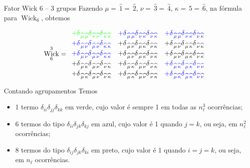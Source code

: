 \documentclass{beamer}
\DeclareMathOperator{\Wick}{Wick}
\def\mi#1{{\,\widehat{#1}}}
\def\ddelta#1#2{\delta_{\mi{#1}\mi{#2}}}
\begin{document}
\begin{frame}{Fator Wick 6 -- 3 grupos} 
	Fazendo $\mu=\mi1=\mi2$, $\nu=\mi3=\mi4$, $\kappa=\mi5=\mi6$, na fórmula para $\Wick_6$, obtemos
 
	\begin{equation*}
		\Wick_6^3 = 
		\begin{array}{c c c}
			\color{green}+ \ddelta{\mu}{\mu} \ddelta{\nu}{\nu} \ddelta{\kappa}{\kappa} &\color{blue} +\ddelta{\mu}{\mu} \ddelta{\nu}{\kappa} \ddelta{\nu}{\kappa} & \color{blue}+\ddelta{\mu}{\mu} \ddelta{\nu}{\kappa} \ddelta{\nu}{\kappa} \\[1mm]
			\color{blue}+ \ddelta{\mu}{\nu} \ddelta{\mu}{\nu} \ddelta{\kappa}{\kappa} & +\ddelta{\mu}{\nu} \ddelta{\mu}{\kappa} \ddelta{\nu}{\kappa} & +\ddelta{\mu}{\nu} \ddelta{\mu}{\kappa} \ddelta{\nu}{\kappa} \\[1mm]
			\color{blue}+ \ddelta{\mu}{\nu} \ddelta{\mu}{\nu} \ddelta{\kappa}{\kappa} & +\ddelta{\mu}{\nu} \ddelta{\mu}{\kappa} \ddelta{\nu}{\kappa} & +\ddelta{\mu}{\nu} \ddelta{\mu}{\kappa} \ddelta{\nu}{\kappa} \\[1mm]
			+ \ddelta{\mu}{\kappa} \ddelta{\mu}{\nu} \ddelta{\nu}{\kappa} & +\ddelta{\mu}{\kappa} \ddelta{\mu}{\nu} \ddelta{\nu}{\kappa} & \color{blue} +\ddelta{\mu}{\kappa} \ddelta{\mu}{\kappa} \ddelta{\nu}{\nu} \\[1mm]
			+ \ddelta{\mu}{\kappa} \ddelta{\mu}{\nu} \ddelta{\nu}{\kappa} & +\ddelta{\mu}{\kappa} \ddelta{\mu}{\nu} \ddelta{\nu}{\kappa} & \color{blue} +\ddelta{\mu}{\kappa} \ddelta{\mu}{\kappa} \ddelta{\nu}{\nu}
		\end{array}
	\end{equation*}
\end{frame}

\begin{frame}{Contando agrupamentos}
	Temos 
	\begin{itemize}
		\item 1 termo $\delta_{ii}\delta_{jj}\delta_{kk}$ em {\color{green} verde}, cujo valor é sempre 1 em todas as $n_\ell^3$ ocorrências;
		\item 6 termos do tipo  $\delta_{ii}\delta_{jk}\delta_{kj}$	em {\color{blue} azul}, cujo valor é 1 quando $j=k$, ou seja, em $n_\ell^2$ ocorrências;
		\item 8 termos do tipo $\delta_{ij}\delta_{jk}\delta_{ki}$ em preto, cujo valor é 1 quando $i=j=k$, ou seja, em $n_\ell$ ocorrências.
	\end{itemize}
\end{frame}
\end{document}
